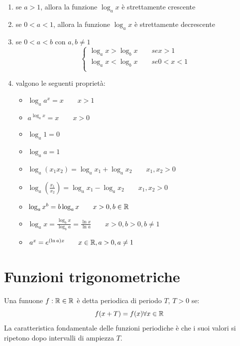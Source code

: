 \begin{enumerate}
	\item se $a>1$, allora la funzione $\log_a x$ è strettamente crescente
	\item se $0<a<1$, allora la funzione $\log_a x$ è strettamente decrescente
	\item se $0<a<b$ con $a,b\neq 1$
	\[\begin{cases}
	\log_a x > \log_b x \qquad se x>1 \\
	\log_a x < \log_b x \qquad se 0<x<1 \\
	\end{cases}\]
	\item valgono le seguenti proprietà:
	\begin{itemize}
		\item $\log_a a^x = x \qquad x>1$
		\item $a^{\log_a x}=x \qquad x>0$
		\item $\log_a 1 = 0$
		\item $\log_a a = 1$
		\item $\log_a (x_1 x_2)= \log_a x_1 + \log_a x_2 \qquad x_1,x_2 > 0$
		\item $\log_a (\frac{x_1}{x_2})=\log_a x_1 - \log_a x_2 \qquad x_1,x_2 > 0$
		\item $\log_a x^b = b \log_a x \qquad x>0, b \in \mathbb{R}$
		\item $\log_a x= \frac{\log_b x}{\log_b a}=\frac{\ln x}{\ln a}\qquad x>0,b>0,b\neq 1$
		\item $a^x = e^{(\ln a)x} \qquad x\in \mathbb{R}, a>0, a \neq 1$
	\end{itemize}
\end{enumerate}

\begin{figure}[bth]
\myfloatalign
{} 
\end{figure}

\section{Funzioni trigonometriche}
Una funuone $f:\mathbb{R} \in \mathbb{R}$ è detta periodica di periodo $T$, $T>0$ se:
\[f(x+T)=f(x) \forall x \in \mathbb{R}\]
La caratteristica fondamentale delle funzioni periodiche è che i suoi valori si ripetono dopo intervalli di ampiezza $T$.

